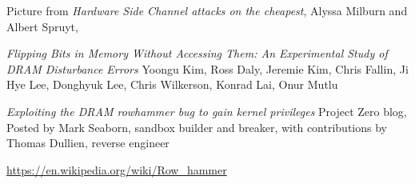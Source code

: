 \documentclass[Screen16to9,17pt]{foils}
\begin{document}


Picture from
\emph{Hardware Side Channel attacks on the cheapest}, Alyssa Milburn and Albert Spruyt,



\emph{Flipping Bits in Memory Without Accessing Them: An Experimental Study of DRAM Disturbance Errors} Yoongu Kim, Ross Daly, Jeremie Kim, Chris Fallin, Ji Hye Lee, Donghyuk Lee, Chris Wilkerson, Konrad Lai, Onur Mutlu\\
{\footnotesize{}}

\emph{Exploiting the DRAM rowhammer bug to gain kernel privileges}
Project Zero blog, Posted by Mark Seaborn, sandbox builder and breaker, with contributions by Thomas Dullien, reverse engineer\\
{\footnotesize{}}

\url{https://en.wikipedia.org/wiki/Row_hammer}



\slidenext
\end{document}
